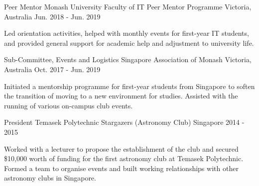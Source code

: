 \begin{cventries}
  \cventry
    {Peer Mentor}
    {Monash University Faculty of IT Peer Mentor Programme}
    {Victoria, Australia}
    {Jun. 2018 - Jun. 2019}
    {
      \begin{cvitems}
        \item {Led orientation activities, helped with monthly events for first-year IT students, and provided general support for academic help and adjustment to university life.}
      \end{cvitems}
    }
    \cventry
    {Sub-Committee, Events and Logistics}
    {Singapore Association of Monash}
    {Victoria, Australia}
    {Oct. 2017 - Jun. 2019}
    {
      \begin{cvitems}
        \item {Initiated a mentorship programme for first-year students from Singapore to soften the transition of moving to a new environment for studies. Assisted with the running of various on-campus club events.}
      \end{cvitems}
    }
   \cventry
    {President}
    {Temasek Polytechnic Stargazers (Astronomy Club)}
    {Singapore}
    {2014 - 2015}
    {
      \begin{cvitems}
        \item {Worked with a lecturer to propose the establishment of the club and secured \$10,000 worth of funding for the first astronomy club at Temasek Polytechnic. Formed a team to organise events and built working relationships with other astronomy clubs in Singapore.}
      \end{cvitems}
    }
\end{cventries}
